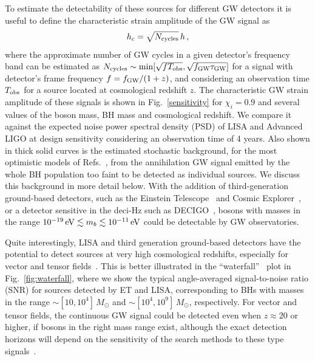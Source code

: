 \documentclass[11pt]{article}
\numberwithin{equation}{section} %
\begin{document}
To estimate the detectability of these sources for different GW detectors it is useful to define the characteristic strain amplitude of the GW signal as~\cite{Moore:2014lga}
%
\begin{equation}
h_c=\sqrt{N_{\rm cycles}}\,h\,, 
\label{eq:char_strain}
\end{equation}
where the approximate number of GW cycles in a given detector's frequency band can be estimated as $N_{\rm cycles}\sim \min[\sqrt{f T_{\rm obs}},\sqrt{ f_{\rm GW} \tau_{\rm GW}}]$ for a signal with detector's frame frequency $f=f_{\rm GW}/(1+z)$, and considering an observation time $T_{\rm obs}$ for a source located at cosmological redshift $z$.
%
The characteristic GW strain amplitude of these signals is shown in Fig.~\ref{sensitivity} for $\chi_i=0.9$ and several values of the boson mass, BH mass and cosmological redshift. We compare it against the expected noise power spectral density (PSD) of LISA and Advanced LIGO at design sensitivity considering an observation time of 4 years. Also shown in thick solid curves is the estimated stochastic background, for the most optimistic models of Refs.~\cite{Brito:2017wnc,Brito:2017zvb}, from the annihilation GW signal emitted by the whole BH population too faint to be detected as individual sources. We discuss this background in more detail below. With the addition of third-generation ground-based detectors, such as the Einstein Telescope~\cite{Hild:2010id} and Cosmic Explorer~\cite{Evans:2016mbw,Essick:2017wyl}, or a detector sensitive in the deci-Hz such as DECIGO~\cite{Kawamura:2006up}, bosons with masses in the range $10^{-19}\,{\rm eV} \lesssim m_b \lesssim 10^{-11}\,{\rm eV}$ could be detectable by GW observatories. 



Quite interestingly, LISA and third generation ground-based detectors have the potential to detect sources at very high 
cosmological redshifts, especially for vector and tensor fields~\cite{Brito:2020lup}.  This is better illustrated in the 
``waterfall''~\cite{Audley:2017drz} plot in Fig.~\ref{fig:waterfall}, where we show the typical angle-averaged signal-to-noise ratio (SNR) for sources detected by ET and LISA, corresponding to BHs with masses in the range $\sim 
[10,10^4]\, M_{\odot}$ and $\sim [10^4,10^9]\, M_{\odot}$, respectively.
For vector and tensor fields, the continuous GW signal could be detected even when $z\approx 20$ 
or higher, if bosons in the right mass range exist, although the exact detection horizons will depend on the sensitivity of the search methods to these type signals~\cite{Isi:2018pzk}.
%
\end{document}
